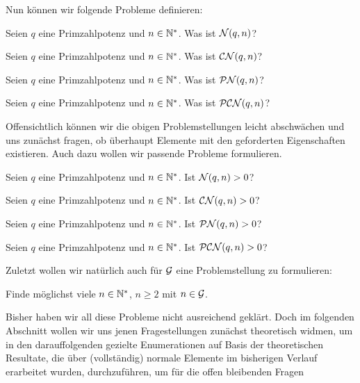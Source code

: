 Nun können wir folgende Probleme definieren:

\begin{problem}[$\cal N(q,n)=?$]
  \label{prob:n=}
  Seien $q$ eine Primzahlpotenz und $n\in \N^\ast$. Was ist
  $\cal N(q,n)$?
\end{problem}
\begin{problem}[$\CN(q,n)=?$]
  \label{prob:cn=}
  Seien $q$ eine Primzahlpotenz und $n\in \N^\ast$. Was ist
  $\CN(q,n)$?
\end{problem}
\begin{problem}[$\PN(q,n)=?$]
  \label{prob:pn=}
  Seien $q$ eine Primzahlpotenz und $n\in \N^\ast$. Was ist
  $\PN(q,n)$?
\end{problem}
\begin{problem}[$\PCN(q,n)=?$]
  \label{prob:pcn=}
  Seien $q$ eine Primzahlpotenz und $n\in \N^\ast$. Was ist
  $\PCN(q,n)$?
\end{problem}

Offensichtlich können wir die obigen Problemstellungen leicht abschwächen und
uns zunächst fragen, ob überhaupt Elemente mit den geforderten Eigenschaften
existieren. Auch dazu wollen wir passende Probleme formulieren.

\begin{problem}[$\cal N(q,n)>0?$]
  \label{prob:n>0}
  Seien $q$ eine Primzahlpotenz und $n\in \N^\ast$. Ist
  $\cal N(q,n)>0$?
\end{problem}
\begin{problem}[$\CN(q,n)>0?$]
  \label{prob:cn>0}
  Seien $q$ eine Primzahlpotenz und $n\in \N^\ast$. Ist
  $\CN(q,n)>0$?
\end{problem}
\begin{problem}[$\PN(q,n)>0?$]
  \label{prob:pn>0}
  Seien $q$ eine Primzahlpotenz und $n\in \N^\ast$. Ist
  $\PN(q,n)>0$?
\end{problem}
\begin{problem}[$\PCN(q,n)>0?$]
  \label{prob:pcn>0}
  Seien $q$ eine Primzahlpotenz und $n\in \N^\ast$. Ist
  $\PCN(q,n)>0$?
\end{problem}


Zuletzt wollen wir natürlich auch für $\G$ eine Problemstellung 
zu formulieren:

\begin{problem}[$n\in \G ?$]
  \label{prob:g}
  Finde möglichst viele $n\in \N^\ast$, $n\geq 2$ mit $n\in \G$.
\end{problem}

Bisher haben wir all diese Probleme nicht ausreichend geklärt. Doch im
folgenden Abschnitt wollen wir uns jenen Fragestellungen zunächst theoretisch
widmen, um in den darauffolgenden gezielte Enumerationen auf Basis der
theoretischen Resultate, die über (vollständig) normale Elemente im bisherigen
Verlauf erarbeitet wurden, durchzuführen, um für die offen bleibenden Fragen 


